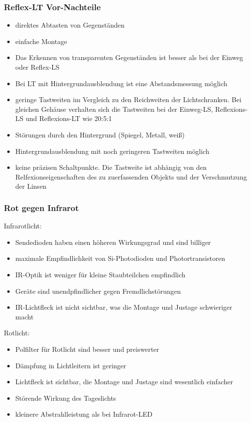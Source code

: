 \documentclass[a4paper]{scrartcl}
\begin{document}
\subsubsection{Reflex-LT Vor-Nachteile}
\begin{itemize}
\item direktes Abtasten von Gegenständen
\item einfache Montage
\item Das Erkennen von transparenten Gegenständen ist besser als bei der Einweg oder Reflex-LS
\item Bei LT mit Hintergrundausblendung ist eine Abstandsmessung möglich
\item geringe Tastweiten im Vergleich zu den Reichweiten der Lichtschranken. Bei gleichen Gehäuse verhalten sich die Tastweiten bei der Einweg-LS, Reflexions-LS und Reflexions-LT wie 20:5:1
\item Störungen durch den Hintergrund (Spiegel, Metall, weiß)
\item Hintergrundausblendung mit noch geringeren Tastweiten möglich
\item keine präzisen Schaltpunkte. Die Tastweite ist abhängig von den Relfexionseigenschaften des zu zuerfassenden Objekts und der Verschmutzung der Linsen
\end{itemize}

\subsubsection{Rot gegen Infrarot}
Infrarotlicht:
\begin{itemize}
\item Sendedioden haben einen höheren Wirkungsgrad und sind billiger
\item maximale Empfindlichkeit von Si-Photodioden und Photortransistoren
\item IR-Optik ist weniger für kleine Staubteilchen empfindlich
\item Geräte sind unendpfindlicher gegen Fremdlichstörungen
\item IR-Lichtfleck ist nicht sichtbar, was die Montage und Justage schwieriger macht
\end{itemize}
Rotlicht:
\begin{itemize}
\item Polfilter für Rotlicht sind besser und preiswerter
\item Dämpfung in Lichtleitern ist geringer
\item Lichtfleck ist sichtbar, die Montage und Justage sind wesentlich einfacher
\item Störende Wirkung des Tageslichts
\item kleinere Abstrahlleistung als bei Infrarot-LED
\end{itemize}
\end{document}
